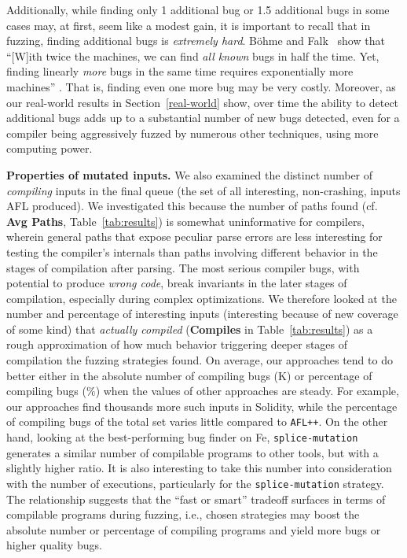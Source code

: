 Additionally, while finding only 1 additional bug or 1.5 additional bugs in some cases may,
at first, seem like a modest gain, it is important to recall that in fuzzing,
finding additional bugs is \emph{extremely hard}.  B\"{o}hme and
Falk~\cite{fuzzexp} show that ``[W]ith twice the machines, we can find
\emph{all known} bugs in half the time. Yet, finding linearly \emph{more} bugs
in the same time requires exponentially more machines'' \cite{fuzzexp}.  That
is, finding even one more bug may be very costly.  Moreover, as our real-world
results in Section~\ref{real-world} show, over time the ability to detect
additional bugs adds up to a substantial number of new bugs detected, even for
a compiler being aggressively fuzzed by numerous other techniques, using more
computing power.

\textbf{Properties of mutated inputs.} We also examined the distinct number of
\emph{compiling} inputs in the final queue (the set of all interesting,
non-crashing, inputs AFL produced).  We investigated this because the number of
paths found (cf. \textbf{Avg Paths}, Table~\ref{tab:results}) is somewhat
uninformative for compilers, wherein general paths that expose peculiar parse
errors are less interesting for testing the compiler's internals than paths
involving different behavior in the stages of compilation after parsing.  The
most serious compiler bugs, with potential to produce \emph{wrong code}, break
invariants in the later stages of compilation, especially during complex
optimizations.  We therefore looked at the number and percentage of interesting
inputs (interesting because of new coverage of some kind) that \emph{actually
compiled} (\textbf{Compiles} in Table~\ref{tab:results}) as a rough
approximation of how much behavior triggering deeper stages of compilation the
fuzzing strategies found. On average, our approaches tend to do better either
in the absolute number of compiling bugs (K) or percentage of compiling bugs
(\%) when the values of other approaches are steady. For example, our approaches
find thousands more such inputs in Solidity, while the percentage of compiling
bugs of the total set varies little compared to \texttt{AFL++}. On the other hand,
looking at the best-performing bug finder on Fe, \texttt{splice-mutation}
generates a similar number of compilable programs to other tools, but with a slightly
higher ratio. It is also interesting to take this number into consideration
with the number of executions, particularly for the \texttt{splice-mutation}
strategy. The relationship suggests that the ``fast or smart'' tradeoff surfaces in terms of
compilable programs during fuzzing, i.e., chosen strategies may boost the
absolute number or percentage of compiling programs and yield more
bugs or higher quality bugs.
